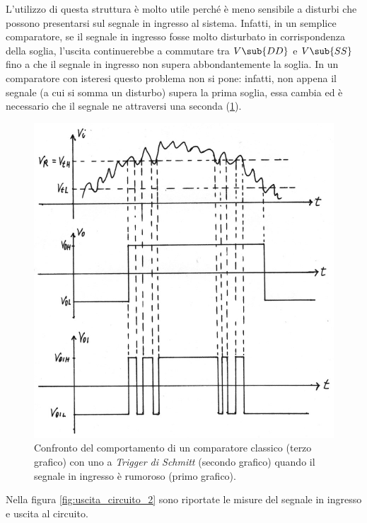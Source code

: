\noindent
L'utilizzo di questa struttura è molto utile perché è meno sensibile a disturbi che possono presentarsi sul segnale in ingresso al sistema. Infatti, in un semplice comparatore, se il segnale in ingresso fosse molto disturbato in corrispondenza della soglia, l'uscita continuerebbe a commutare tra $V\sub{DD}$ e $V\sub{SS}$ fino a che il segnale in ingresso non supera abbondantemente la soglia. In un comparatore con isteresi questo problema non si pone: infatti, non appena il segnale (a cui si somma un disturbo) supera la prima soglia, essa cambia ed è necessario che il segnale ne attraversi una seconda (\Fig\ref{fig:trigger_di_shmitt_vantaggi}).

\begin{figure}[h!]
	\centering
	\includegraphics[width=0.8\linewidth]{./ImageFiles/Laboratorio 3/Usicta Rumorosa e Trigger di Shmitt.jpg}
	\caption{Confronto del comportamento di un comparatore classico (terzo grafico) con uno a \textit{Trigger di Schmitt} (secondo grafico) quando il segnale in ingresso è rumoroso (primo grafico).}
	\label{fig:trigger_di_shmitt_vantaggi}
\end{figure} 
Nella figura \ref{fig:uscita_circuito_2} sono riportate le misure del segnale in ingresso e uscita al circuito.
